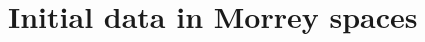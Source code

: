 \documentclass[12pt]{amsart}
\renewcommand{\1}{{\mathbf 1}}
\theoremstyle{others}
\numberwithin{equation}{section}
\begin{document}

\section{Initial data in Morrey spaces}\label{section:Morrey}
\end{document}
